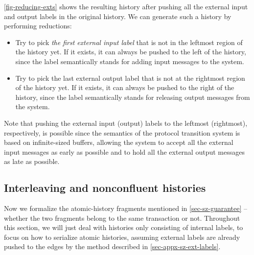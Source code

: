 \documentclass[sigplan,10pt,review,anonymous,screen]{acmart}\settopmatter{printfolios=true,printccs=false,printacmref=false}
\begin{document}
\autoref{fig-reducing-exts} shows the resulting history after pushing all the external input and output labels in the original history.
We can generate such a history by performing reductions:
\begin{itemize}[leftmargin=*]
\item Try to pick \emph{the first external input label} that is not in the leftmost region of the history yet. If it exists, it can always be pushed to the left of the history, since the label semantically stands for adding input messages to the system.
\item Try to pick the last external output label that is not at the rightmost region of the history yet. If it exists, it can always be pushed to the right of the history, since the label semantically stands for releasing output messages from the system.
\end{itemize}
Note that pushing the external input (output) labels to the leftmost (rightmost), respectively, is possible since the semantics of the protocol transition system is based on infinite-sized buffers, allowing the system to accept all the external input messages as early as possible and to hold all the external output messages as late as possible.

\subsection{Interleaving and nonconfluent histories}

\newcommand{\hcont}[2]{\ensuremath{#1 \leadsto #2}}
\newcommand{\hextcont}[3]{\ensuremath{#1 \vdash #2 \leadsto_{\textsf{ext}} #3}}
\newcommand{\hdiscont}[2]{\ensuremath{#1 \not\leadsto #2}}
\newcommand{\hitlv}[2]{\ensuremath{\mathsf{Interleaved}\ #1\ #2}}

Now we formalize the atomic-history fragments mentioned in \autoref{sec-sz-guarantee} -- whether the two fragments belong to the same transaction or not.
Throughout this section, we will just deal with histories only consisting of internal labels, to focus on how to serialize atomic histories, assuming external labels are already pushed to the edges by the method described in \autoref{sec-appx-sz-ext-labels}.
\end{document}
